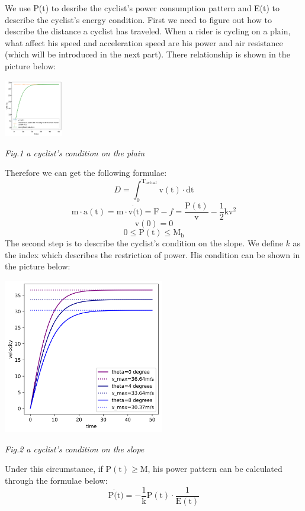 \documentclass[14pt]{article}
\begin{document}
	We use P(t) to desribe the cyclist's power consumption pattern and E(t) to describe the cyclist's energy condition. First we need to figure out how to describe the distance a cyclist has traveled. When a rider is cycling on a plain, what affect his speed and acceleration speed are his power and air resistance (which will be introduced in the next part). There relationship is shown in the picture below:
	\begin{center}
		\includegraphics[height=2.5cm]{1.png}

		\small \textit{Fig.1 a cyclist's condition on the plain}
	\end{center}
	 Therefore we can get the following formulae:
	$$D=\int^{\mathrm{T}_\mathrm{actual}}_0 \mathrm{v}(\mathrm{t})\cdot \mathrm{dt}$$
	$$\mathrm{m} \cdot \mathrm{a}(\mathrm{t})=\mathrm{m} \cdot \mathrm{v}\dot(\mathrm{t})=\mathrm{F}-f=\dfrac{\mathrm{P}(\mathrm{t})}{\mathrm{v}}-\dfrac{1}{2}\mathrm{k}\mathrm{v}^2$$
	$$\mathrm{v}(0)=0$$
	$$0\leq\mathrm{P}(\mathrm{t})\leq\mathrm{M}_\mathrm{b}$$
	The second step is to describe the cyclist's condition on the slope. We define $k$ as the index which describes the restriction of power. His condition can be shown in the picture below:
	\begin{center}
		\includegraphics[width=7cm]{2.png}

		\small \textit{Fig.2 a cyclist's condition on the slope}
	\end{center}
	Under this circumstance, if $\mathrm{P}(\mathrm{t}) \ge \mathrm{M}$, his power pattern can be calculated through the formulae below:
	$$\mathrm{P}\dot(\mathrm{t})=-\dfrac{1}{\mathrm{k}} \mathrm{P}(\mathrm{t}) \cdot \dfrac{1}{\mathrm{E}(\mathrm{t})}$$
\end{document}
